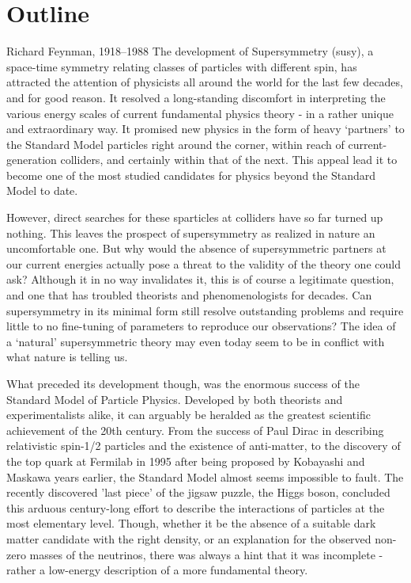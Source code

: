 \chapter*{Outline}
\label{chap:outline}
\thispagestyle{plain}

{Richard Feynman, 1918--1988}
\noindent
The development of Supersymmetry (\acrshort{susy}), a space-time symmetry relating classes of particles with different spin, has attracted the attention of physicists all around the world for the last few decades, and for good reason. It resolved a long-standing discomfort in interpreting the various energy scales of current fundamental physics theory - in a rather unique and extraordinary way. It promised new physics in the form of heavy `partners' to the Standard Model particles right around the corner, within reach of current-generation colliders, and certainly within that of the next. This appeal lead it to become one of the most studied candidates for physics beyond the Standard Model to date.

However, direct searches for these sparticles at colliders have so far turned up nothing. This leaves the prospect of supersymmetry as realized in nature an uncomfortable one. But why would the absence of supersymmetric partners at our current energies actually pose a threat to the validity of the theory one could ask? Although it in no way invalidates it, this is of course a legitimate question, and one that has troubled theorists and phenomenologists for decades. Can supersymmetry in its minimal form still resolve outstanding problems and require little to no fine-tuning of parameters to reproduce our observations? The idea of a `natural' supersymmetric theory may even today seem to be in conflict with what nature is telling us.

What preceded its development though, was the enormous success of the Standard Model of Particle Physics. Developed by both theorists and experimentalists alike, it can arguably be heralded as the greatest scientific achievement of the 20th century. From the success of Paul Dirac in describing relativistic spin-1/2 particles and the existence of anti-matter, to the discovery of the top quark at Fermilab in 1995 after being proposed by Kobayashi and Maskawa years earlier, the Standard Model almost seems impossible to fault. The recently discovered \cite{RN62,RN63} 'last piece' of the jigsaw puzzle, the Higgs boson, concluded this arduous century-long effort to describe the interactions of particles at the most elementary level. Though, whether it be the absence of a suitable dark matter candidate with the right density, or an explanation for the observed non-zero masses of the neutrinos, there was always a hint that it was incomplete - rather a low-energy description of a more fundamental theory.

